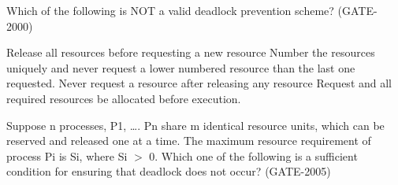 
\begin{questyle}

  \question  Which of the following is NOT a valid deadlock prevention scheme? (GATE- 2000)

  \begin{choices}
    \choice Release all resources before requesting a new resource
    \choice Number the resources uniquely and never request a lower numbered resource than the last one requested.
    \choice Never request a resource after releasing any resource
    \choice Request and all required resources be allocated before execution.
  \end{choices}

  \end{questyle}




\begin{questyle}

  \question  Suppose n processes, P1, …. Pn share m identical resource units, which can be reserved and released one at a time. The maximum resource requirement of process Pi is Si, where Si \(>\) 0. Which one of the following is a sufficient condition for ensuring that deadlock does not occur? (GATE-2005)

  \begin{choices}
  \end{choices}

  \end{questyle}




